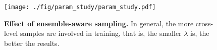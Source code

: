  

\begin{figure}[t]
    \begin{center}
    \texttt{[image: ./fig/param\_study/param\_study.pdf]}
    \end{center}
    \vspace{-7mm}
    \caption{{\bf Effect of ensemble-aware sampling.} In general, the more cross-level samples are involved in training, that is, the smaller $\lambda$ is, the better the results.}
    \label{fig:param_study}
\end{figure}
